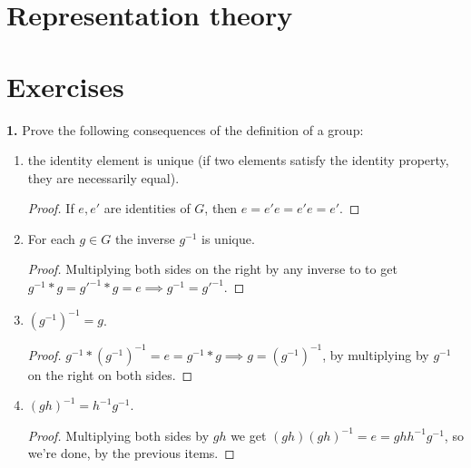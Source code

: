 \documentclass{book}
\theoremstyle{definition}
\begin{document}
\newpage
\section{Representation theory}













\newpage
\section{Exercises}
\noindent \textbf{1.} Prove the following consequences of the definition of a group:
\begin{enumerate}
	\item the identity element is unique (if two elements satisfy the identity property, they are
	necessarily equal).
	
	\begin{proof}
		If $e,e'$ are identities of $G$, then $e = e'e = e'e = e'$. 
	\end{proof}
	
	\item For each $g \in G$ the inverse $g^{-1}$ is unique.
	
	\begin{proof}
		Multiplying both sides on the right by any inverse to to get $g^{-1}*g = g'^{-1}*g = e \implies g^{-1} = g'^{-1}$.
	\end{proof}
	
	\item $(g^{-1})^{-1} = g$.
	
	\begin{proof}
		$g^{-1}* (g^{-1})^{-1} = e = g^{-1}*g \implies g=(g^{-1})^{-1}$, by multiplying by $g^{-1}$ on the right on both sides. 
	\end{proof}
	
	\item $(gh)^{-1} = h^{-1}g^{-1}$.
	
	\begin{proof}
		Multiplying both sides by $gh$ we get $(gh)(gh)^{-1} = e = ghh^{-1}g^{-1}$, so we're done, by the previous items.
	\end{proof}


\end{enumerate}
\end{document}
